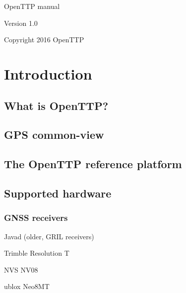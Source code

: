 \documentclass[11pt,a4paper,openany,oneside]{book}
\newenvironment{description*}%
  {\setlength{\parskip}{0pt}%
	 \begin{description}%
		\setlength{\topsep}{-12pt}%
		\setlength{\itemindent}{-12pt}%
    \setlength{\itemsep}{0pt}%
		\setlength{\itemsep}{0pt}}%
  {\end{description}}
\begin{document}
\begin{titlepage}

\begin{center}
{\Huge OpenTTP manual}
\end{center}

\vspace*{4cm}
\begin{center}
Version 1.0
\end{center}

\begin{center}
Copyright 2016 OpenTTP
\end{center}

\end{titlepage}

\tableofcontents
\listoffigures
\listoftables

\lstset{
	xleftmargin=24pt,
	basewidth=0.5em,
	basicstyle=\ttfamily,
	escapechar=\%
}

\chapter{Introduction}

\section{What is OpenTTP?}

\section{GPS common-view}

\section{The OpenTTP reference platform}

\section{Supported hardware}

	\subsection{GNSS receivers}
	
	\begin{description*}
		\item[Javad] (older, GRIL receivers)
		\item[Trimble] Resolution T
		\item[NVS] NV08
		\item[ublox] Neo8MT
	\end{description*}
	
\end{document}
